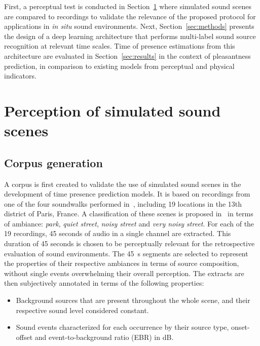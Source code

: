 \documentclass[11pt,a4paper]{article}
\begin{document}
First, a perceptual test is conducted in Section~\ref{sec:data} where simulated sound scenes are compared to recordings to validate the relevance of the proposed protocol for applications in \textit{in situ} sound environments. Next, Section~\ref{sec:methods} presents the design of a deep learning architecture that performs multi-label sound source recognition at relevant time scales. Time of presence estimations from this architecture are evaluated in Section~\ref{sec:results} in the context of pleasantness prediction, in comparison to existing models from perceptual and physical indicators.

\section{Perception of simulated sound scenes}
\label{sec:data}

\subsection{Corpus generation}
\label{sec:data_corp}

A corpus is first created to validate the use of simulated sound scenes in the development of time presence prediction models. It is based on recordings from one of the four soundwalks performed in~\cite{aumond2017}, including 19 locations in the 13th district of Paris, France. A classification of these scenes is proposed in~\cite{gloaguen2017} in terms of ambiance: \textit{park}, \textit{quiet street}, \textit{noisy street} and \textit{very noisy street}. For each of the 19 recordings, 45 seconds of audio in a single channel are extracted. This duration of 45 seconds is chosen to be perceptually relevant for the retrospective evaluation of sound environments. The 45~s segments are selected to represent the properties of their respective ambiances in terms of source composition, without single events overwhelming their overall perception. The extracts are then subjectively annotated in terms of the following properties:

\begin{itemize}
\item Background sources that are present throughout the whole scene, and their respective sound level considered constant.
\item Sound events characterized for each occurrence by their source type, onset-offset and event-to-background ratio (EBR) in dB.
\end{itemize}
\end{document}
